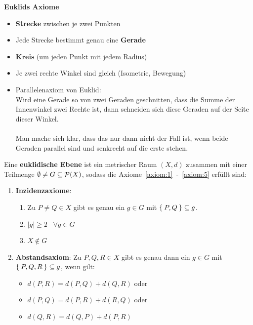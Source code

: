 \textbf{Euklids Axiome}
\begin{itemize}
    \item \textbf{Strecke} zwischen je zwei Punkten
    \item Jede Strecke bestimmt genau eine \textbf{Gerade}
    \item \textbf{Kreis} (um jeden Punkt mit jedem Radius)
    \item Je zwei rechte Winkel sind gleich (Isometrie, Bewegung)
    \item Parallelenaxiom von Euklid:\\
        Wird eine Gerade so von zwei Geraden geschnitten, dass die 
        Summe der Innenwinkel zwei Rechte ist, dann schneiden sich
        diese Geraden auf der Seite dieser Winkel.\\
        \\
        Man mache sich klar, dass das nur dann nicht der Fall ist, 
        wenn beide Geraden parallel sind und senkrecht auf die erste stehen.
\end{itemize}

\begin{definition}%
    Eine \textbf{euklidische Ebene} ist ein metrischer Raum $(X,d)$ 
    zusammen mit einer Teilmenge $\emptyset \neq G \subseteq \mathcal{P}(X)$, sodass die
    Axiome~\ref{axiom:1}~-~\ref{axiom:5} erfüllt sind:
    \begin{enumerate}[label=§\arabic*),ref=§\arabic*]
        \item \textbf{Inzidenzaxiome}:\label{axiom:1}
            \begin{enumerate}[label=(\roman*),ref=\theenumi{} (\roman*)]
                \item \label{axiom:1.1} Zu $P \neq Q \in X$ gibt es genau ein $g \in G$ mit
                      $\Set{P, Q} \subseteq g$.
                \item \label{axiom:1.2} $|g| \geq 2 \;\;\; \forall g \in G$
                \item \label{axiom:1.3} $X \notin G$
            \end{enumerate}
        \item \textbf{Abstandsaxiom}: Zu $P, Q, R \in X$ gibt es \label{axiom:2}
              genau dann ein $g \in G$ mit $\Set{P, Q, R} \subseteq g$,
              wenn gilt: 
              \begin{itemize}[]
                \item $d(P, R) = d(P, Q) + d(Q, R)$ oder
                \item $d(P, Q) = d(P, R) + d(R, Q)$ oder
                \item $d(Q, R) = d(Q, P) + d(P, R)$
              \end{itemize}
    \end{enumerate}
\end{definition}

